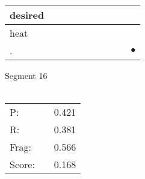 \documentclass[landscape]{article}
\newcommand{\ssp}{\hspace{2pt}}
\newcommand{\mex}{\cellcolor{g}$\bullet$}
\begin{document}
\begin{tabular}{|l|p{10pt}|p{10pt}|p{10pt}|p{10pt}|p{10pt}|p{10pt}|p{10pt}|p{10pt}|p{10pt}|}
\hline
\ssp desired \ssp&\hspace{2pt}&\hspace{2pt}&\hspace{2pt}&\hspace{2pt}&\hspace{2pt}&\hspace{2pt}&\hspace{2pt}&\hspace{2pt}&\hspace{2pt}\\
\hline
\ssp heat \ssp&\hspace{2pt}&\hspace{2pt}&\hspace{2pt}&\hspace{2pt}&\hspace{2pt}&\hspace{2pt}&\hspace{2pt}&\hspace{2pt}&\hspace{2pt}\\
\hline
\ssp \cellcolor{ref8}. \ssp&\hspace{2pt}&\hspace{2pt}&\hspace{2pt}&\hspace{2pt}&\hspace{2pt}&\hspace{2pt}&\hspace{2pt}&\hspace{2pt}&\hspace{2pt}\mex\\
\hline
\end{tabular}

\vspace{6pt}
\noindent Segment 16\\\\
\noindent\begin{tabular}{lm{12pt}r}
\hline
P:&&0.421\\
R:&&0.381\\
Frag:&&0.566\\
Score:&&0.168\\
\end{tabular}

\newpage
\end{document}
